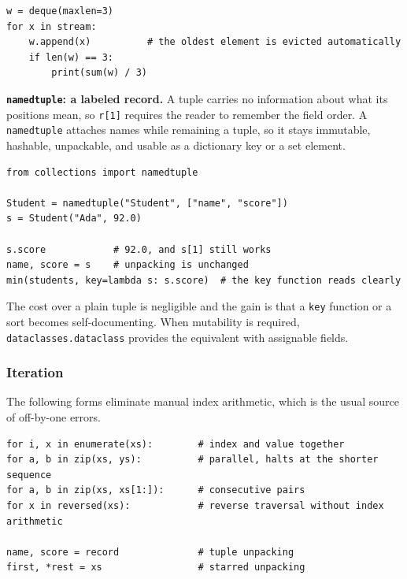 \begin{lstlisting}[style=python, caption={A rolling window of the last 3 values}]
w = deque(maxlen=3)
for x in stream:
    w.append(x)          # the oldest element is evicted automatically
    if len(w) == 3:
        print(sum(w) / 3)
\end{lstlisting}

\medskip

\noindent\textbf{\texttt{namedtuple}: a labeled record.}
A tuple carries no information about what its positions mean, so \texttt{r[1]}
requires the reader to remember the field order. A \texttt{namedtuple} attaches
names while remaining a tuple, so it stays immutable, hashable, unpackable, and
usable as a dictionary key or a set element.

\newpage

\begin{lstlisting}[style=python, caption={namedtuple}]
from collections import namedtuple

Student = namedtuple("Student", ["name", "score"])
s = Student("Ada", 92.0)

s.score            # 92.0, and s[1] still works
name, score = s    # unpacking is unchanged
min(students, key=lambda s: s.score)  # the key function reads clearly
\end{lstlisting}

The cost over a plain tuple is negligible and the gain is that a \texttt{key}
function or a sort becomes self-documenting. When mutability is required,
\texttt{dataclasses.dataclass} provides the equivalent with assignable fields.

\subsubsection*{Iteration}

The following forms eliminate manual index arithmetic, which is the usual
source of off-by-one errors.

\begin{lstlisting}[style=python, caption={Iteration forms}]
for i, x in enumerate(xs):        # index and value together
for a, b in zip(xs, ys):          # parallel, halts at the shorter sequence
for a, b in zip(xs, xs[1:]):      # consecutive pairs
for x in reversed(xs):            # reverse traversal without index arithmetic

name, score = record              # tuple unpacking
first, *rest = xs                 # starred unpacking
\end{lstlisting}

